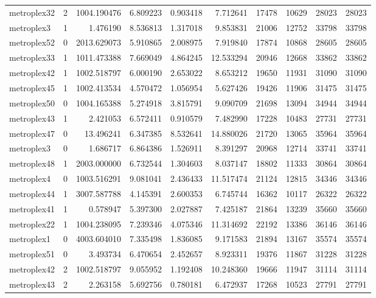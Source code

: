 \begin{longtable}{|l|r|r|r|r|r|r|r|r|r|}
metroplex32 & 2 & 1004.190476 & 6.809223 & 0.903418 & 7.712641 & 17478 & 10629 & 28023 & 28023 \\
metroplex3 & 1 & 1.476190 & 8.536813 & 1.317018 & 9.853831 & 21006 & 12752 & 33798 & 33798 \\
metroplex52 & 0 & 2013.629073 & 5.910865 & 2.008975 & 7.919840 & 17874 & 10868 & 28605 & 28605 \\
metroplex33 & 1 & 1011.473388 & 7.669049 & 4.864245 & 12.533294 & 20946 & 12668 & 33862 & 33862 \\
metroplex42 & 1 & 1002.518797 & 6.000190 & 2.653022 & 8.653212 & 19650 & 11931 & 31090 & 31090 \\
metroplex45 & 1 & 1002.413534 & 4.570472 & 1.056954 & 5.627426 & 19426 & 11906 & 31475 & 31475 \\
metroplex50 & 0 & 1004.165388 & 5.274918 & 3.815791 & 9.090709 & 21698 & 13094 & 34944 & 34944 \\
metroplex43 & 1 & 2.421053 & 6.572411 & 0.910579 & 7.482990 & 17228 & 10483 & 27731 & 27731 \\
metroplex47 & 0 & 13.496241 & 6.347385 & 8.532641 & 14.880026 & 21720 & 13065 & 35964 & 35964 \\
metroplex3 & 0 & 1.686717 & 6.864386 & 1.526911 & 8.391297 & 20968 & 12714 & 33741 & 33741 \\
metroplex48 & 1 & 2003.000000 & 6.732544 & 1.304603 & 8.037147 & 18802 & 11333 & 30864 & 30864 \\
metroplex4 & 0 & 1003.516291 & 9.081041 & 2.436433 & 11.517474 & 21124 & 12815 & 34346 & 34346 \\
metroplex44 & 1 & 3007.587788 & 4.145391 & 2.600353 & 6.745744 & 16362 & 10117 & 26322 & 26322 \\
metroplex41 & 1 & 0.578947 & 5.397300 & 2.027887 & 7.425187 & 21864 & 13239 & 35660 & 35660 \\
metroplex22 & 1 & 1004.238095 & 7.239346 & 4.075346 & 11.314692 & 22192 & 13386 & 36146 & 36146 \\
metroplex1 & 0 & 4003.604010 & 7.335498 & 1.836085 & 9.171583 & 21894 & 13167 & 35574 & 35574 \\
metroplex51 & 0 & 3.493734 & 6.470654 & 2.452657 & 8.923311 & 19376 & 11867 & 31228 & 31228 \\
metroplex42 & 2 & 1002.518797 & 9.055952 & 1.192408 & 10.248360 & 19666 & 11947 & 31114 & 31114 \\
metroplex43 & 2 & 2.263158 & 5.692756 & 0.780181 & 6.472937 & 17268 & 10523 & 27791 & 27791 \\

\end{longtable}
